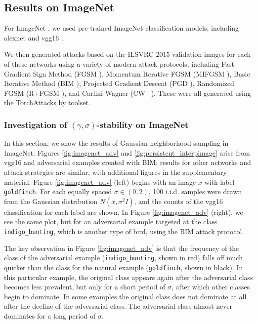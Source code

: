 \subsection{Results on ImageNet}

For ImageNet \citep{Imagenet-old}, we used pre-trained ImageNet classification models, including alexnet \citep{alexnet} and vgg16 \citep{simonyan2014very}.

We then generated attacks based on the ILSVRC 2015 \citep{ILSVRC15}
validation images for each of these networks using a variety of modern
attack protocols, including Fast Gradient Sign Method (FGSM
\citep{goodfellow_explaining_2014}), Momentum Iterative FGSM (MIFGSM
\citep{dongMIFGSM}), Basic Iterative Method (BIM
\citep{kurakin_adversarial_2016}), Projected Gradient Descent (PGD
\citep{madry_towards_2017}), Randomized FGSM (R+FGSM
\citep{tramer2018ensemble}), and Carlini-Wagner (CW
~\citet{carlini_towards_2016}). These were all generated using the
TorchAttacks by \citet{kim2021torchattacks} toolset.

\subsubsection{Investigation of $(\gamma, \sigma)$-stability on ImageNet}

In this section, we show the results of Gaussian neighborhood sampling in ImageNet. Figures \ref{fig:imagenet_adv} and \ref{fig:persistent_interpimage} arise from vgg16 and adversarial examples created with BIM; results for other networks and attack strategies are similar, with additional figures in the supplementary material. Figure \ref{fig:imagenet_adv} (left) begins with an image $x$ with label \texttt{goldfinch}. For each equally spaced $\sigma\in(0,2)$, 100 i.i.d. samples were drawn from the Gaussian distribution $N(x,\sigma^2I)$, and the counts of the vgg16 classification for each label are shown. In Figure \ref{fig:imagenet_adv} (right), we see the same plot, but for an adversarial example targeted at the class \texttt{indigo\_bunting}, which is another type of bird, using the BIM attack protocol. %

The key observation in Figure \ref{fig:imagenet_adv} is that the frequency of the class of the adversarial example (\texttt{indigo\_bunting}, shown in red) falls off much quicker than the class for the natural example (\texttt{goldfinch}, shown in black). In this particular example, the original class appears again after the adversarial class becomes less prevalent, but only for a short period of $\sigma$, after which other classes begin to dominate. In some examples the original class does not dominate at all after the decline of the adversarial class. The adversarial class almost never dominates for a long period of $\sigma$. 

